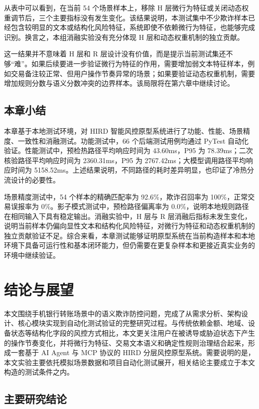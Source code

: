 \documentclass{xduugthesis}
\begin{document}
从表中可以看到，在当前 54 个场景样本上，移除 H 层微行为特征或关闭动态权重调节后，三个主要指标没有发生变化。该结果说明，本测试集中不少欺诈样本已经包含较明显的文本或结构化风险特征，系统即使不依赖微行为特征，也能够完成识别。换言之，本组消融实验没有充分体现 H 层和动态权重机制的独立贡献。

这一结果并不意味着 H 层和 R 层设计没有价值，而是提示当前测试集还不够“难”。如果后续要进一步验证微行为特征的作用，需要增加弱文本特征样本，例如交易备注较正常、但用户操作节奏异常的场景；如果要验证动态权重机制，需要增加规则分数与语义分数冲突的边界样本。该局限将在第六章中继续讨论。

\section{本章小结}

本章基于本地测试环境，对 HIRD 智能风控原型系统进行了功能、性能、场景精度、一致性和消融测试。功能测试中，66 个后端测试用例均通过 PyTest 自动化验证。性能测试中，预检热路径平均响应时间为 43.60ms，P95 为 78.39ms；二次核验路径平均响应时间为 2360.31ms，P95 为 2767.42ms；大模型调用路径平均响应时间为 5158.52ms。上述结果说明，不同路径的耗时差异明显，也印证了冷热分流设计的必要性。

场景精度测试中，54 个样本的精确匹配率为 92.6\%，欺诈召回率为 100\%，正常交易误报率为 0\%。影子模式测试中，预检路径偏离率为 0.0\%，说明本地规则路径在相同输入下具有稳定输出。消融实验中，H 层与 R 层消融后指标未发生变化，说明当前样本仍偏向显性文本和结构化风险特征，对微行为特征和动态权重机制的独立贡献验证不足。综合来看，本章测试能够证明原型系统在当前构造样本和本地环境下具备可运行性和基本闭环能力，但仍需要在更复杂样本和更接近真实业务的环境中继续验证。

\chapter{结论与展望}

本文围绕手机银行转账场景中的语义欺诈防控问题，完成了从需求分析、架构设计、核心模块实现到自动化测试验证的完整研究过程。与传统依赖金额、地域、设备状态等结构化字段的风控方式相比，本文更关注用户在被诱导或胁迫状态下产生的操作节奏变化，并将微行为特征、交易文本语义和确定性规则治理结合起来，形成一套基于 AI Agent 与 MCP 协议的 HIRD 分层风控原型系统。需要说明的是，本文实验主要依托模拟场景数据和项目自动化测试展开，相关结论主要成立于本文构造的测试条件之内。

\section{主要研究结论}
\end{document}
